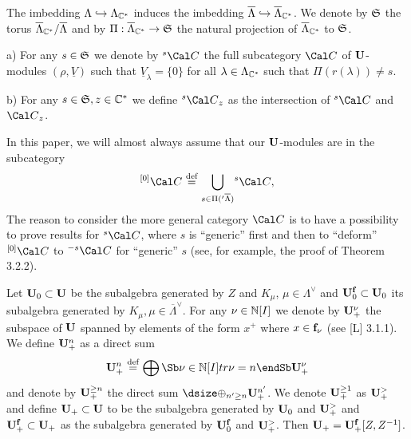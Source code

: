 The imbedding  $\Lambda \hookrightarrow \Lambda_{{\Bbb C}^*}$  induces the
imbedding  $\overline{\Lambda} \hookrightarrow \overline{\Lambda}_{{\Bbb
C}^*}$.
We denote by  ${\frak S}$  the torus $\overline{\Lambda}_{{\Bbb
C}^*}/\overline{\Lambda}$
and by  $\Pi:  \overline{\Lambda}_{{\Bbb C}^*} \to {\frak S}$  the natural
projection of
$\overline{\Lambda}_{{\Bbb C}^*}$  to ${\frak S}$.

  a)  For any $s \in {\frak S}$  we denote by
${}^s{\Cal C}$  the full subcategory ${\Cal C}$  of ${\bold U}$-modules
$(\rho,\underline{V})$  such that  $\underline{V}_\lambda = \{ 0\}$  for all
$\lambda \in \Lambda_{{\Bbb C}^*}$  such that $\Pi(r(\lambda)) \ne s$.

b)  For any  $s \in {\frak S}, z \in {\Bbb C}^*$  we define  ${}^s{\Cal C}_z$
as
the intersection of  ${}^s{\Cal C}$  and  ${\Cal C}_z$.
\endproclaim

  In this paper, we will almost always assume that our
${\bold U}$-modules are in the subcategory
$$
{}^{[0]}{\Cal C}\ {\buildrel {\text{def}}\over =}\
{\bigcup_{s\in\Pi('\overline{\Lambda})}} {}^s{\Cal C} ,
$$
The reason to consider the more general category ${\Cal C}$  is to have a
possibility to prove results for ${}^s{\Cal C}$, where $s$ is ``generic'' first
and then to ``deform''  ${}^{[0]}{\Cal C}$  to ${}^{-s}{\Cal C}$  for
``generic'' $s$ (see, for example, the proof of Theorem 3.2.2).

  Let  ${\bold U}_0 \subset {\bold U}$  be the subalgebra
generated by $Z$ and  $K_\mu$, $\mu \in \Lambda^\vee$ and
${\bold U}^{\bold f}_0 \subset {\bold U}_0$  its subalgebra generated by
$K_\mu, \mu \in \overline{\Lambda}^\vee$.  For any  $\nu \in {\Bbb N}[I]$
we denote by  ${\bold U}^\nu_+$  the subspace of ${\bold U}$ spanned by
elements of the form
$x^+$  where $x \in {\bold f}_\nu$ (see [L] 3.1.1).  We define ${\bold U}^n_+$
as
a direct sum
$$
{\bold U}^n_+\ {\buildrel{\text{def}}\over =}\ {\bigoplus\Sb\\ \nu \in {\Bbb
N}[I]\\
tr \nu = n\endSb} {\bold U}^\nu_+
$$
and denote by  ${\bold U}^{\ge n}_+$  the direct sum
${\dsize\oplus_{n'\ge n}} {\bold U}_+^{n'}$.
We denote    ${\bold U}_+^{\ge 1}$  as  ${\bold U}_+^>$  and define  ${\bold
U}_+ \subset {\bold U}$  to be
the subalgebra generated by  ${\bold U}_0$  and  ${\bold U}_+^>$  and
${\bold U}_+^{\bold f} \subset {\bold U}_+$  as the subalgebra generated by
${\bold U}_0^{\bold f}$  and  ${\bold U}_+^>$.  Then
${\bold U}_+ = {\bold U}_+^{\bold f}[Z,Z^{-1}]$.

